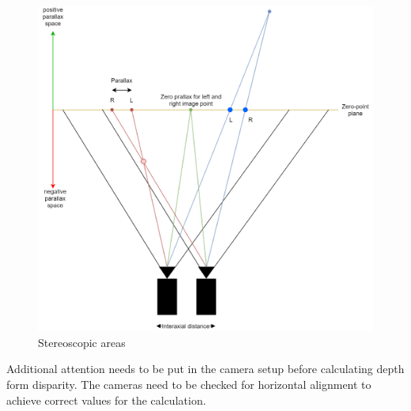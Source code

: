 \begin{figure}[H]
\includegraphics[width=\textwidth]{images/Stereo_diagram.png}
\caption{Stereoscopic areas}
\label{stereo_diagram} 
\end{figure}
Additional attention needs to be put in the camera setup before calculating depth form disparity. The cameras need to be checked for horizontal alignment to achieve correct values for the calculation.

